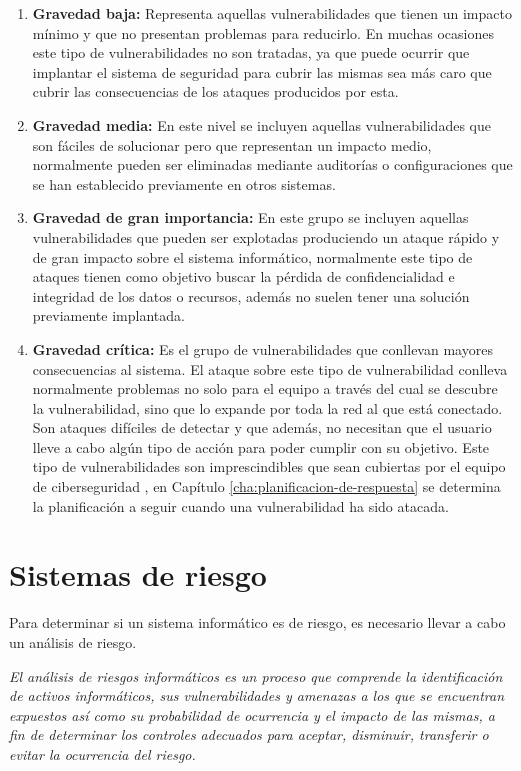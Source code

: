 \begin{enumerate}
\item {\bfseries Gravedad baja: }
Representa aquellas vulnerabilidades que tienen un impacto mínimo y que no presentan problemas para reducirlo. En muchas ocasiones este tipo de vulnerabilidades no son tratadas, ya que puede ocurrir que implantar el sistema de seguridad para cubrir las mismas sea más caro que cubrir las consecuencias de los ataques producidos por esta.
\item {\bfseries Gravedad media: }
En este nivel se incluyen aquellas vulnerabilidades que son fáciles de solucionar pero que representan un impacto medio, normalmente pueden ser eliminadas mediante auditorías o configuraciones que se han establecido previamente en otros sistemas.
\item {\bfseries Gravedad de gran importancia:}
En este grupo se incluyen aquellas vulnerabilidades que pueden ser explotadas produciendo un ataque rápido y de gran impacto sobre el sistema informático, normalmente este tipo de ataques tienen como objetivo buscar la pérdida de confidencialidad e integridad de los datos o recursos, además no suelen tener una solución previamente implantada.
\item {\bfseries Gravedad crítica: }
Es el grupo de vulnerabilidades que conllevan mayores consecuencias al sistema. El ataque sobre este tipo de vulnerabilidad conlleva normalmente problemas no solo para el equipo a través del cual se descubre la vulnerabilidad, sino que lo expande por toda la red al que está conectado. Son ataques difíciles de detectar y que además, no necesitan que el usuario lleve a cabo algún tipo de acción para poder cumplir con su objetivo.
Este tipo de vulnerabilidades son imprescindibles que sean cubiertas por el equipo de ciberseguridad , en Capítulo \ref{cha:planificacion-de-respuesta} se determina la planificación a seguir cuando una vulnerabilidad ha sido atacada.
\end{enumerate}


\chapter{Sistemas de riesgo}
\label{cha:sistemas-de-riesgo}
Para determinar si un sistema informático es de riesgo, es necesario llevar a cabo un análisis de riesgo.

\emph{El análisis de riesgos informáticos es un proceso que comprende la identificación de activos informáticos, sus vulnerabilidades y amenazas a los que se encuentran expuestos así como su probabilidad de ocurrencia y el impacto de las mismas, a fin de determinar los controles adecuados para aceptar, disminuir, transferir o evitar la ocurrencia del riesgo.\cite{wikip}}
        
